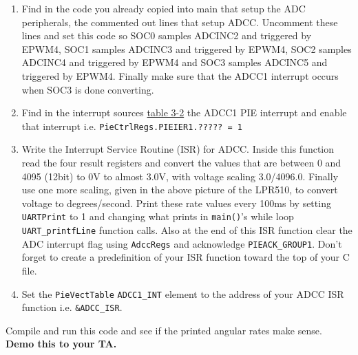 \documentclass[11pt]{article}
\begin{document}
\begin{enumerate}
    \item Find in the code you already copied into main that setup the ADC peripherals, the commented out lines that setup ADCC. Uncomment these lines and set this code so SOC0 samples ADCINC2 and triggered by EPWM4, SOC1 samples ADCINC3 and triggered by EPWM4, SOC2 samples ADCINC4 and triggered by EPWM4 and SOC3 samples ADCINC5 and triggered by EPWM4. Finally make sure that the ADCC1 interrupt occurs when SOC3 is done converting.
        \item Find in the interrupt sources \href{http://coecsl.ece.illinois.edu/se423/PeripheralInterruptChannelMapTable.pdf}{table 3-2} the ADCC1 PIE interrupt and enable that interrupt i.e. \texttt{PieCtrlRegs.PIEIER1.????? = 1}
        \item Write the Interrupt Service Routine (ISR) for ADCC. Inside this function read the four result registers and convert the values that are between 0 and 4095 (12bit) to 0V to almost 3.0V, with voltage scaling 3.0/4096.0. Finally use one more scaling, given in the above picture of the LPR510, to convert voltage to degrees/second. Print these rate values every 100ms by setting \texttt{UARTPrint} to 1 and changing what prints in \texttt{main()}’s while loop \texttt{UART_printfLine} function calls. Also at the end of this ISR function clear the ADC interrupt flag using \texttt{AdccRegs} and acknowledge \texttt{PIEACK_GROUP1}. Don’t forget to create a predefinition of your ISR function toward the top of your C file.
        \item Set the \texttt{PieVectTable} \texttt{ADCC1_INT} element to the address of your ADCC ISR function i.e. \texttt{&ADCC_ISR}.
\end{enumerate}
%
\begin{checkoff}
        Compile and run this code and see if the printed angular rates make sense. \textbf{Demo this to your TA.}
\end{checkoff}
%
\end{document}
